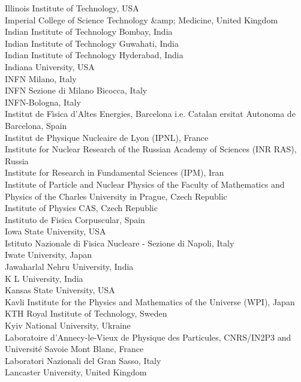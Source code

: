 \begin{center}
Illinois Institute of Technology, USA \\
Imperial College of Science Technology \&amp; Medicine, United Kingdom \\
Indian Institute of Technology Bombay, India \\
Indian Institute of Technology Guwahati, India \\
Indian Institute of Technology Hyderabad, India \\
Indiana University, USA \\
INFN Milano, Italy \\
INFN Sezione di Milano Bicocca, Italy \\
INFN-Bologna, Italy \\
Institut de Fìsica d'Altes Energies, Barcelona i.e. Catalan ersitat Autonoma de Barcelona, Spain \\
Institut de Physique Nucleaire de Lyon (IPNL), France \\
Institute for Nuclear Research of the Russian Academy of Sciences (INR RAS), Russia \\
Institute for Research in Fundamental Sciences (IPM), Iran \\
Institute of Particle and Nuclear Physics of the Faculty of Mathematics and Physics of the Charles University in Prague, Czech Republic \\
Institute of Physics CAS, Czech Republic \\
Instituto de Fisica Corpuscular, Spain \\
Iowa State University, USA \\
Istituto Nazionale di Fisica Nucleare - Sezione di Napoli, Italy \\
Iwate University, Japan \\
Jawaharlal Nehru University, India \\
K L University, India \\
Kansas State University, USA \\
Kavli Institute for the Physics and Mathematics of the Universe (WPI), Japan \\
KTH Royal Institute of Technology, Sweden \\
Kyiv National University, Ukraine \\
Laboratoire d'Annecy-le-Vieux de Physique des Particules, CNRS/IN2P3 and Université Savoie Mont Blanc, France \\
Laboratori Nazionali del Gran Sasso, Italy \\
Lancaster University, United Kingdom \\

\end{center}
